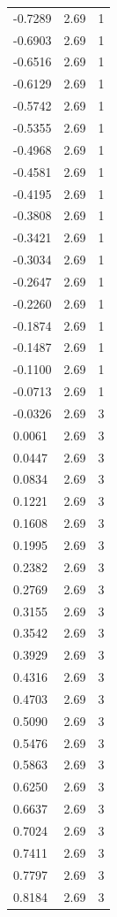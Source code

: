 \begin{longtable}{lrr}
  -0.7289 & 2.69 & 1 \\
  -0.6903 & 2.69 & 1 \\
  -0.6516 & 2.69 & 1 \\
  -0.6129 & 2.69 & 1 \\
  -0.5742 & 2.69 & 1 \\
  -0.5355 & 2.69 & 1 \\
  -0.4968 & 2.69 & 1 \\
  -0.4581 & 2.69 & 1 \\
  -0.4195 & 2.69 & 1 \\
  -0.3808 & 2.69 & 1 \\
  -0.3421 & 2.69 & 1 \\
  -0.3034 & 2.69 & 1 \\
  -0.2647 & 2.69 & 1 \\
  -0.2260 & 2.69 & 1 \\
  -0.1874 & 2.69 & 1 \\
  -0.1487 & 2.69 & 1 \\
  -0.1100 & 2.69 & 1 \\
  -0.0713 & 2.69 & 1 \\
  -0.0326 & 2.69 & 3 \\
  0.0061 & 2.69 & 3 \\
  0.0447 & 2.69 & 3 \\
  0.0834 & 2.69 & 3 \\
  0.1221 & 2.69 & 3 \\
  0.1608 & 2.69 & 3 \\
  0.1995 & 2.69 & 3 \\
  0.2382 & 2.69 & 3 \\
  0.2769 & 2.69 & 3 \\
  0.3155 & 2.69 & 3 \\
  0.3542 & 2.69 & 3 \\
  0.3929 & 2.69 & 3 \\
  0.4316 & 2.69 & 3 \\
  0.4703 & 2.69 & 3 \\
  0.5090 & 2.69 & 3 \\
  0.5476 & 2.69 & 3 \\
  0.5863 & 2.69 & 3 \\
  0.6250 & 2.69 & 3 \\
  0.6637 & 2.69 & 3 \\
  0.7024 & 2.69 & 3 \\
  0.7411 & 2.69 & 3 \\
  0.7797 & 2.69 & 3 \\
  0.8184 & 2.69 & 3 \\

\end{longtable}

